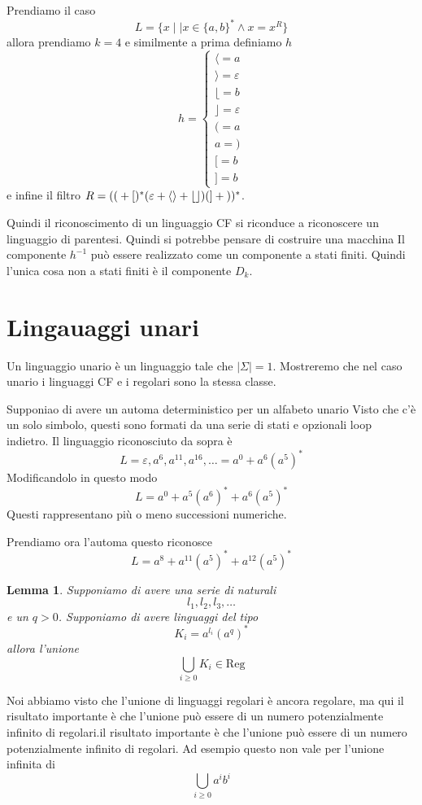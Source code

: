 \documentclass[12pt]{report}
\newtheorem{lemma}{Lemma}
\theoremstyle{definition}
\begin{document}
\begin{tcolorbox}[breakable]
	Prendiamo il caso 
	$$L = \{ x \mid \mid x \in \{a, b\}^* \wedge x = x^R \} $$
	allora prendiamo $k = 4$ e similmente a prima definiamo $h$
	$$ h = 
	\begin{cases} 
		\langle = a \\
		\rangle = \varepsilon \\
		\lfloor = b \\
		\rfloor = \varepsilon \\
		( = a \\ 
		a = ) \\ 
		[ = b \\ 
		] = b 
	\end{cases} $$ 
	e infine il filtro $R = (\text{\texttt{$($}} + \text{\texttt{$[$}})^* ( \varepsilon + \text{\texttt{$\langle \rangle$}} + \text{\texttt{$\lfloor \rfloor$}}) (\text{\texttt{$]$}} + \text{\texttt{$)$}})^*$.
\end{tcolorbox}
Quindi il riconoscimento di un linguaggio CF si riconduce a riconoscere un linguaggio di parentesi.
Quindi si potrebbe pensare di costruire una macchina
Il componente $h^{-1}$ può essere realizzato come un componente a stati finiti.
Quindi l'unica cosa non a stati finiti è il componente $D_k$.

\section{Lingauaggi unari}\label{sec:linguaggi unari}
Un linguaggio unario è un linguaggio tale che $| \Sigma | = 1$.
Mostreremo che nel caso unario i linguaggi CF e i regolari sono la stessa classe.

Supponiao di avere un automa deterministico per un alfabeto unario
Visto che c'è un solo simbolo, questi sono formati da una serie di stati e opzionali loop indietro.
Il linguaggio riconosciuto da sopra è
$$ L = \varepsilon, a^6, a^11, a^16, \dots = a^0 + a^6(a^5)^* $$
Modificandolo in questo modo
$$ L = a^0 + a^5(a^6)^* + a^6(a^5)^*$$
Questi rappresentano più o meno successioni numeriche.

Prendiamo ora l'automa
questo riconosce
$$ L = a^8 + a^{11}(a^5)^* + a^{12}(a^5)^* $$

\begin{lemma}
	Supponiamo di avere una serie di naturali
	$$ l_1, l_2, l_3, \dots $$
	e un $q > 0$.
	Supponiamo di avere linguaggi del tipo
	$$ K_i = a^{l_i} (a^q)^* $$
	allora l'unione
	$$ \bigcup_{i \geq 0} K_i \in \text{Reg} $$
\end{lemma}
Noi abbiamo visto che l'unione di linguaggi regolari è ancora regolare, ma qui il risultato importante è che l'unione può essere di un numero potenzialmente infinito di regolari.il risultato importante è che l'unione può essere di un numero potenzialmente infinito di regolari.
Ad esempio questo non vale per l'unione infinita di 
$$ \bigcup_{i \geq 0} a^i b^i $$
\end{document}
